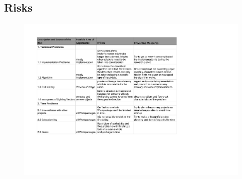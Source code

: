 \subsection{Risks} \label{sec:risks}
\begin{figure}[H] 
	\center 
	\includegraphics[scale = 0.7]{Images/risks.pdf}			
\end{figure}




\newpage

























